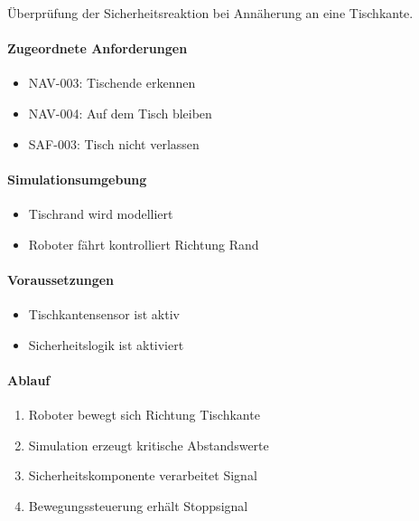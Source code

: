 Überprüfung der Sicherheitsreaktion bei Annäherung an eine Tischkante.

\paragraph{Zugeordnete
Anforderungen}\label{zugeordnete-anforderungen-18}

\begin{itemize}
\tightlist
\item
  NAV-003: Tischende erkennen
\item
  NAV-004: Auf dem Tisch bleiben
\item
  SAF-003: Tisch nicht verlassen
\end{itemize}

\paragraph{Simulationsumgebung}\label{simulationsumgebung-3}

\begin{itemize}
\tightlist
\item
  Tischrand wird modelliert
\item
  Roboter fährt kontrolliert Richtung Rand
\end{itemize}

\paragraph{Voraussetzungen}\label{voraussetzungen-18}

\begin{itemize}
\tightlist
\item
  Tischkantensensor ist aktiv
\item
  Sicherheitslogik ist aktiviert
\end{itemize}

\paragraph{Ablauf}\label{ablauf-18}

\begin{enumerate}
\def\labelenumi{\arabic{enumi}.}
\tightlist
\item
  Roboter bewegt sich Richtung Tischkante
\item
  Simulation erzeugt kritische Abstandswerte
\item
  Sicherheitskomponente verarbeitet Signal
\item
  Bewegungssteuerung erhält Stoppsignal
\end{enumerate}

